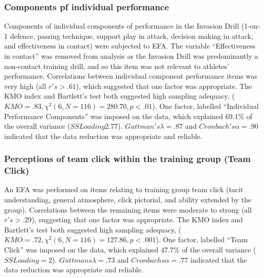 \begin{CJK}{UTF8}{gbsn}
\subsubsection{Components pf individual performance\label{app9:dataReductionPerformance}}
Components of individual components of performance in the Invasion Drill (1-on-1 defence, passing technique, support play in attack, decision making in attack, and effectiveness in contact) were subjected to EFA.  The variable ``Effectiveness in contact'' was removed from analysis as the Invasion Drill was predominantly a non-contact training drill, and so this item was not relevant to athletes' performance.  Correlations between individual component performance items was very high (all $r's > .61$), which suggested that one factor was appropriate.  The KMO index and Bartlett's test both suggested high sampling adequacy, ($KMO = .83, \chi^2(6, N = 116) = 280.70, p < .01$). One factor, labelled ``Individual Performance Components'' was imposed on the data, which explained 69.1\% of the overall variance ($SS Loading  2.77$).  $Guttman's \lambda = .87$  and  $Cronbach's \alpha = .90$ indicated that the data reduction was appropriate and reliable.

\subsubsection{Perceptions of team click within the training group (Team Click)}
An EFA was performed on items relating to training group team click (tacit understanding, general atmosphere, click pictorial, and ability extended by the group).  Correlations between the remaining items were moderate to strong (all $r's > .29$), suggesting that one factor was appropriate. The KMO index and Bartlett's test both suggested high sampling adequacy, ($KMO =  .72, \chi^2(6, N = 116) = 127.86, p < .001$).
One factor, labelled ``Team Click'' was imposed on the data, which explained 47.7\% of the overall variance ($SS Loading = 2$). $Guttmans \lambda = .73$ and $Cronbachs \alpha = .77$ indicated that the data reduction was appropriate and reliable.



\end{CJK}
